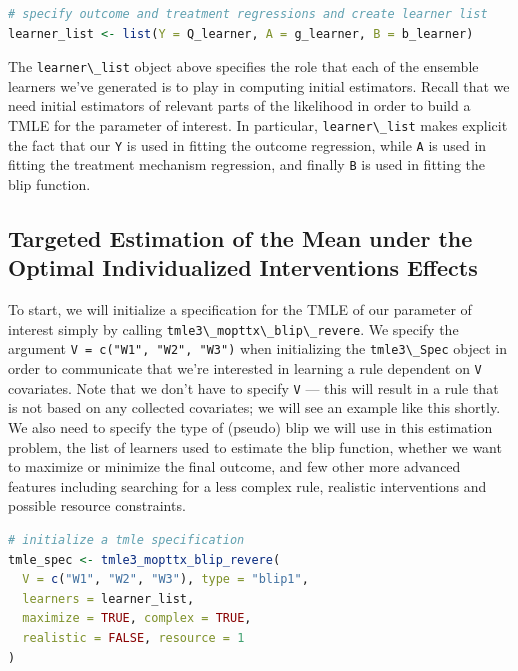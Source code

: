 \documentclass[
  12pt, krantz2,
]{krantz}
\newcommand{\passthrough}[1]{#1}
\newcommand{\1}{\mathbbm{1}}
\theoremstyle{definition}
\theoremstyle{definition}
\theoremstyle{definition}
\theoremstyle{definition}
\theoremstyle{remark}
\begin{document}
\begin{lstlisting}[language=R]
# specify outcome and treatment regressions and create learner list
learner_list <- list(Y = Q_learner, A = g_learner, B = b_learner)
\end{lstlisting}

The \passthrough{\lstinline!learner\_list!} object above specifies the role that each of the ensemble
learners we've generated is to play in computing initial estimators. Recall that
we need initial estimators of relevant parts of the likelihood in order to
build a TMLE for the parameter of interest. In particular, \passthrough{\lstinline!learner\_list!}
makes explicit the fact that our \passthrough{\lstinline!Y!} is used in fitting the outcome regression,
while \passthrough{\lstinline!A!} is used in fitting the treatment mechanism regression, and finally \passthrough{\lstinline!B!}
is used in fitting the blip function.

\hypertarget{targeted-estimation-of-the-mean-under-the-optimal-individualized-interventions-effects}{%
\subsection{Targeted Estimation of the Mean under the Optimal Individualized Interventions Effects}\label{targeted-estimation-of-the-mean-under-the-optimal-individualized-interventions-effects}}

To start, we will initialize a specification for the TMLE of our parameter of
interest simply by calling \passthrough{\lstinline!tmle3\_mopttx\_blip\_revere!}. We specify the argument
\passthrough{\lstinline!V = c("W1", "W2", "W3")!} when initializing the \passthrough{\lstinline!tmle3\_Spec!} object in order to
communicate that we're interested in learning a rule dependent on \passthrough{\lstinline!V!}
covariates. Note that we don't have to specify \passthrough{\lstinline!V!} --- this will result in a rule
that is not based on any collected covariates; we will see an example like this
shortly. We also need to specify the type
of (pseudo) blip we will use in this estimation problem, the list of learners used
to estimate the blip function, whether we want to maximize or minimize the final
outcome, and few other more advanced features including searching for a less
complex rule, realistic interventions and possible resource constraints.

\begin{lstlisting}[language=R]
# initialize a tmle specification
tmle_spec <- tmle3_mopttx_blip_revere(
  V = c("W1", "W2", "W3"), type = "blip1",
  learners = learner_list,
  maximize = TRUE, complex = TRUE,
  realistic = FALSE, resource = 1
)
\end{lstlisting}
\end{document}
